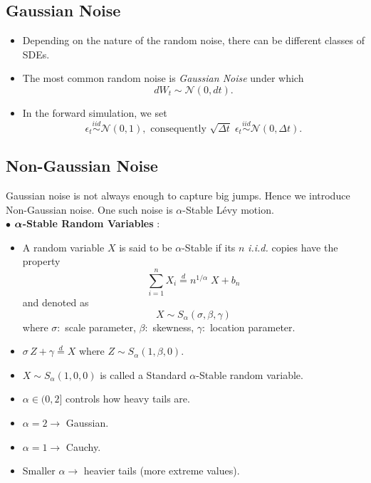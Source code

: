 \subsection{Gaussian Noise}

\begin{itemize}
\item Depending on the nature of the random noise, there can be different classes of SDEs. 

\item The most common random noise is \textit{Gaussian Noise} under which $$dW_t \sim \mathcal{N}(0, dt).$$

\item In the forward simulation, we set $$\epsilon_t \overset{iid}{\sim} \mathcal{N}(0, 1), \text{ consequently } \sqrt{\Delta t} \; \epsilon_t \overset{iid}{\sim} \mathcal{N}(0, \Delta t).$$
\end{itemize}

\subsection{Non-Gaussian Noise}

Gaussian noise is not always enough to capture big jumps. Hence we introduce Non-Gaussian noise. One such noise is $\alpha$-Stable Lévy motion.\\[1em]

$\bullet$ \textbf{$\boldsymbol{\alpha}$-Stable Random Variables} : 

\begin{itemize}

\item A random variable $X$ is said to be $\alpha$-Stable if its $n$ \textit{i.i.d.} copies have the property $$\sum \limits_{i = 1}^{n} X_i \overset{d}{=} n^{1/\alpha} \; X + b_n$$ and denoted as $$X \sim S_{\alpha} (\sigma, \beta, \gamma)$$ where $\sigma :$ scale parameter, $\beta :$ skewness, $\gamma :$ location parameter.

\item $\sigma \, Z + \gamma \overset{d}{=} X$ where $Z \sim S_{\alpha}(1, \beta, 0)$.

\item $X \sim S_{\alpha}(1, 0, 0)$ is called a Standard $\alpha$-Stable random variable.

\item $\alpha \in (0, 2]$ controls how heavy tails are.

\item $\alpha = 2 \rightarrow$ Gaussian.

\item $\alpha = 1 \rightarrow$ Cauchy.

\item Smaller $\alpha \rightarrow$ heavier tails (more extreme values).
\end{itemize}


